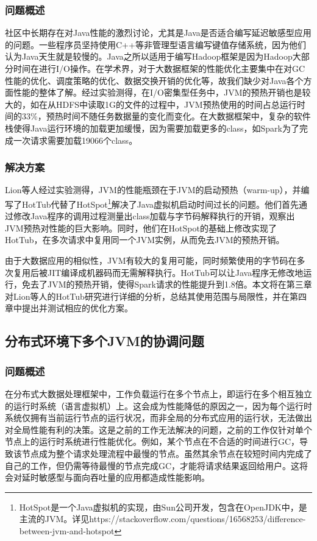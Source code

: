 \documentclass[lang=cn,12pt,a4paper,cite=authoryear]{elegantpaper}
\begin{document}
\subsubsection{问题概述}
社区中长期存在对Java性能的激烈讨论，尤其是Java是否适合编写延迟敏感型应用的问题\cite{debate1,debate2,debate3,debate4}。一些程序员坚持使用C++等非管理型语言编写键值存储系统，因为他们认为Java天生就是较慢的。Java之所以适用于编写Hadoop框架是因为Hadoop大部分时间在进行I/O操作\cite{why}。在学术界，对于大数据框架的性能优化主要集中在对GC性能的优化、调度策略的优化、数据交换开销的优化等，故我们缺少对Java各个方面性能的整体了解。经过实验测得，在I/O密集型任务中，JVM的预热开销也是较大的，如在从HDFS中读取1G的文件的过程中，JVM预热使用的时间占总运行时间的33\%\cite{DBLP:conf/osdi/LionCSZGY16}，预热时间不随任务数据量的变化而变化。在大数据框架中，复杂的软件栈使得Java运行环境的加载更加缓慢，因为需要加载更多的class，如Spark为了完成一次请求需要加载19066个class。

\subsubsection{解决方案}
Lion等人经过实验测得，JVM的性能瓶颈在于JVM的启动预热（warm-up），并编写了HotTub\cite{DBLP:conf/osdi/LionCSZGY16}代替了HotSpot\footnote{HotSpot是一个Java虚拟机的实现，由Sun公司开发，包含在OpenJDK中，是主流的JVM。详见https://stackoverflow.com/questions/16568253/difference-between-jvm-and-hotspot}解决了Java虚拟机启动时间过长的问题。他们首先通过修改Java程序的调用过程测量出class加载与字节码解释执行的开销，观察出JVM预热对性能的巨大影响。同时，他们在HotSpot的基础上修改实现了HotTub，在多次请求中复用同一个JVM实例，从而免去JVM的预热开销。

由于大数据应用的相似性，JVM有较大的复用可能，同时频繁使用的字节码在多次复用后被JIT编译成机器码而无需解释执行。HotTub可以让Java程序无修改地运行，免去了JVM的预热开销，使得Spark请求的性能提升到1.8倍。本文将在第三章对Lion等人的HotTub研究进行详细的分析，总结其使用范围与局限性，并在第四章中提出并测试相应的优化方案。

\subsection{分布式环境下多个JVM的协调问题}
\subsubsection{问题概述}
在分布式大数据处理框架中，工作负载运行在多个节点上，即运行在多个相互独立的运行时系统（语言虚拟机）上。这会成为性能降低的原因之一，因为每个运行时系统仅拥有当前运行节点的运行状况，而非全局的分布式应用的运行状，无法做出对全局性能有利的决策。这是之前的工作无法解决的问题，之前的工作仅针对单个节点上的运行时系统进行性能优化。例如，某个节点在不合适的时间进行GC，导致该节点成为整个请求处理流程中最慢的节点。虽然其余节点在较短时间内完成了自己的工作，但仍需等待最慢的节点完成GC，才能将请求结果返回给用户。这将会对延时敏感型与面向吞吐量的应用都造成性能影响。
\end{document}
